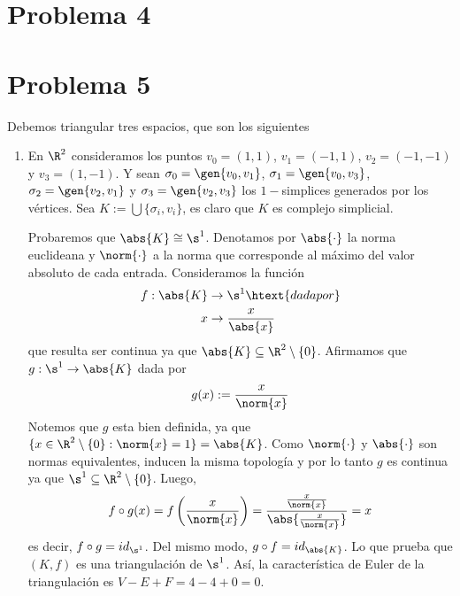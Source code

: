 \documentclass{article}
\begin{document}
\section*{Problema 4}

\section*{Problema 5}
\noindent Debemos triangular tres espacios, que son los siguientes
\begin{enumerate}
    \item En $\R^{2}$ consideramos los puntos $v_{0}=(1,1)$, $v_{1}=(-1,1)$, $v_{2}=(-1,-1)$ y 
    $v_{3}=(1,-1)$. Y sean $\sigma_{0}=\gen{v_{0},v_{1}}$, $\sigma_{1}=\gen{v_{0},v_{3}}$, 
    $\sigma_{2}=\gen{v_{2},v_{1}}$ y $\sigma_{3}=\gen{v_{2},v_{3}}$ los $1-$simplices generados
    por los vértices. Sea $K:=\bigcup\{\sigma_{i},v_{i}\}$, es claro que $K$ es complejo 
    simplicial.
    \begin{center} %
    \end{center}
    Probaremos que $\abs{K}\cong\s^{1}$. Denotamos por $\abs{\cdot}$ la norma euclideana y 
    $\norm{\cdot}$ a la norma que corresponde al máximo del valor absoluto de cada entrada. 
    Consideramos la función
    \begin{align*}
        f:\abs{K} &\to \s^{1}\htext{dada por} \\
        x &\to \frac{x}{\abs{x}}
    \end{align*}
    que resulta ser continua ya que $\abs{K}\subseteq\R^{2}\setminus\{0\}$. Afirmamos que 
    $g:\s^{1}\to\abs{K}$ dada por
    \begin{equation*}
        g(x):=\frac{x}{\norm{x}}
    \end{equation*}
    Notemos que $g$ esta bien definida, ya que $\{x\in\R^{2}\setminus\{0\}:\norm{x}=1\}=\abs{K}$. 
    Como $\norm{\cdot}$ y $\abs{\cdot}$ son normas equivalentes, inducen la misma topología y por
    lo tanto $g$ es continua ya que $\s^{1}\subseteq\R^{2}\setminus\{0\}$. Luego,
    \begin{equation*}
        f\circ g(x)=f\left(\frac{x}{\norm{x}}\right)
        =\frac{\frac{x}{\norm{x}}}{\abs{\frac{x}{\norm{x}}}}=x
    \end{equation*}
    es decir, $f\circ g=id_{\s^{1}}$. Del mismo modo, $g\circ f=id_{\abs{K}}$. Lo que prueba que
    $(K,f)$ es una triangulación de $\s^{1}$. Así, la característica de Euler de la triangulación
    es $V-E+F=4-4+0=0$.


\end{enumerate}
\end{document}
